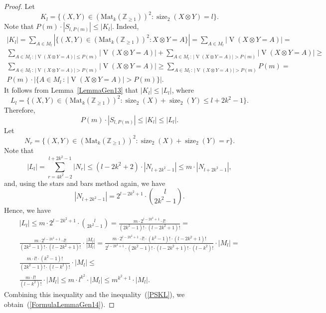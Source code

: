 \documentclass[reqno,12pt]{amsart}
\theoremstyle{definition}
\newcommand{\Mat}{\mathrm{Mat}}
\DeclareMathOperator{\size}{size}
\DeclareMathOperator{\V}{\mathrm{V}}
\begin{document}
\begin{proof}
Let 
$$
K_l = \{(X, Y) \in (\Mat_k(\mathbb{Z}_{\geq 1}))^2 : \size_2(X \otimes Y) = l\}.
$$
Note that $P(m) \cdot |S_{l, P(m)}| \leq |K_l|$.
Indeed,
\begin{multline*}
|K_l| = \sum_{A \in M_l}|\{(X, Y) \in (\Mat_k(\mathbb{Z}_{\geq 1}))^2 : X \otimes Y = A\}| =
\sum_{A \in M_l}|\!\V(X \otimes Y = A)| = \\
\sum_{A \in M_l \,:\, |\!\V(X \otimes Y = A)| \leq P(m)}|\!\V(X \otimes Y = A)| +
\sum_{A \in M_l \,:\, |\!\V(X \otimes Y = A)| > P(m)}|\!\V(X \otimes Y = A)| \geq \\
\sum_{A \in M_l \,:\, |\!\V(X \otimes Y = A)| > P(m)}|\!\V(X \otimes Y = A)| \geq 
\sum_{A \in M_l \,:\, |\!\V(X \otimes Y = A)| > P(m)} P(m) =\\
P(m) \cdot |\{A \in M_l \,:\, |\!\V(X \otimes Y = A)| > P(m)\}|.
\end{multline*}
It follows from Lemma~\ref{LemmaGen13} that
$|K_l| \leq |L_{l}|$, where
$$
L_l = \{(X, Y) \in (\Mat_k(\mathbb{Z}_{\geq 1}))^2 : \size_2(X) + \size_2(Y) \leq l + 2k^2 - 1\}.
$$
Therefore,
\begin{equation}\label{PSKL}
P(m) \cdot |S_{l, P(m)}| \leq |K_l| \leq |L_{l}|.    
\end{equation}
Let
$$
N_r = \{(X, Y) \in (\Mat_k(\mathbb{Z}_{\geq 1}))^2 : \size_2(X) + \size_2(Y) = r\}.
$$
Note that
$$
|L_{l}| =
\sum_{r = 4k^2 - 2}^{l + 2k^2 - 1} |N_r| \leq (l - 2k^2 + 2) \cdot |N_{l + 2k^2 - 1}| \leq m \cdot |N_{l + 2k^2 - 1}|,
$$
and, using the stars and bars method again, we have
$$
|N_{l + 2k^2 - 1}| = 2^{l - 2k^2 + 1}\cdot \binom{l}{2k^2 - 1}.
$$
Hence, we have
\begin{multline*}
|L_{l}| \leq
m \cdot 2^{l - 2k^2 + 1}\cdot \binom{l}{2k^2 - 1} =
\frac{m \cdot 2^{l - 2k^2 + 1}\cdot l!}{(2k^2 - 1)!\cdot(l - 2k^2 + 1)!} = \\
\frac{m \cdot 2^{l - 2k^2 + 1}\cdot l!}{(2k^2 - 1)!\cdot (l - 2k^2 + 1)!} \cdot \frac{|M_l|}{|M_l|}= 
\frac{m \cdot 2^{l - 2k^2 + 1}\cdot l! \cdot (k^2 - 1)! \cdot (l - 2k^2 + 1)!}{2^{l - 2k^2 + 1}\cdot(2k^2 - 1)!\cdot(l - 2k^2 + 1)!\cdot(l - k^2)!} \cdot |M_l|= \\
\frac{m \cdot l! \cdot (k^2 - 1)!}{(2k^2 - 1)!\cdot(l - k^2)!} \cdot |M_l|\leq\\
\frac{m \cdot l!}{(l - k^2)!} \cdot |M_l|\leq
m \cdot l^{k^2} \cdot |M_l|\leq
 m^{k^2 + 1} \cdot |M_l|.
\end{multline*}
Combining this inequality and the inequality~(\ref{PSKL}), we obtain~(\ref{FormulaLemmaGen14}).
\end{proof}
\end{document}
